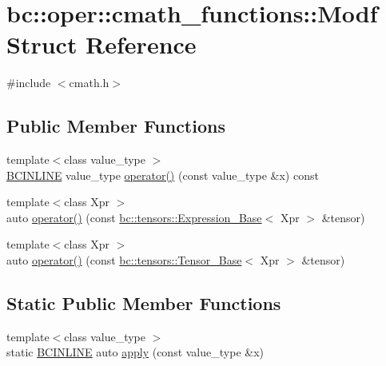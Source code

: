\hypertarget{structbc_1_1oper_1_1cmath__functions_1_1Modf}{}\section{bc\+:\+:oper\+:\+:cmath\+\_\+functions\+:\+:Modf Struct Reference}
\label{structbc_1_1oper_1_1cmath__functions_1_1Modf}


{\ttfamily \#include $<$cmath.\+h$>$}

\subsection*{Public Member Functions}
\begin{DoxyCompactItemize}
\item 
{\footnotesize template$<$class value\+\_\+type $>$ }\\\hyperlink{common_8h_a6699e8b0449da5c0fafb878e59c1d4b1}{B\+C\+I\+N\+L\+I\+NE} value\+\_\+type \hyperlink{structbc_1_1oper_1_1cmath__functions_1_1Modf_ad8cf9552e39fffaf031aaf33b1360f77}{operator()} (const value\+\_\+type \&x) const
\item 
{\footnotesize template$<$class Xpr $>$ }\\auto \hyperlink{structbc_1_1oper_1_1cmath__functions_1_1Modf_af142ccee1997e1a25ef160a3549b5d69}{operator()} (const \hyperlink{classbc_1_1tensors_1_1Expression__Base}{bc\+::tensors\+::\+Expression\+\_\+\+Base}$<$ Xpr $>$ \&tensor)
\item 
{\footnotesize template$<$class Xpr $>$ }\\auto \hyperlink{structbc_1_1oper_1_1cmath__functions_1_1Modf_ac8b6f349be7ae4ceff903de832cc59aa}{operator()} (const \hyperlink{classbc_1_1tensors_1_1Tensor__Base}{bc\+::tensors\+::\+Tensor\+\_\+\+Base}$<$ Xpr $>$ \&tensor)
\end{DoxyCompactItemize}
\subsection*{Static Public Member Functions}
\begin{DoxyCompactItemize}
\item 
{\footnotesize template$<$class value\+\_\+type $>$ }\\static \hyperlink{common_8h_a6699e8b0449da5c0fafb878e59c1d4b1}{B\+C\+I\+N\+L\+I\+NE} auto \hyperlink{structbc_1_1oper_1_1cmath__functions_1_1Modf_a8ad5783eb4bbf2ef0cb6327bc7b8ec75}{apply} (const value\+\_\+type \&x)
\end{DoxyCompactItemize}



